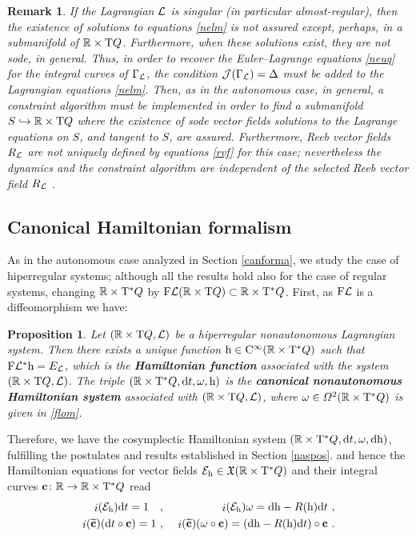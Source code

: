 \documentclass[12pt]{report}
\newtheorem{prop}[teor]{Proposition}
\newtheorem{remark}[teor]{Remark}
\def\bea{\begin{eqnarray}}
\def\eea{\end{eqnarray}}
\def\vf{\mathfrak X}
\def\df{{\mit\Omega}}
\def\Lag{{\cal L}}
\def\d{{\rm d}}
\def\Real{\mathbb{R}}
\def\Tan{{\rm T}}
\def\inn{\mathop{i}\nolimits}
\def\Cinfty{{\rm C}^\infty}
\begin{document}
\begin{remark}{\rm
If the Lagrangian $\Lag$ is singular (in particular almost-regular), 
then the existence of solutions to equations \eqref{nelm}
is not assured except, perhaps, in a
submanifold of $\Real\times\Tan Q$. Furthermore,
when these solutions exist, they are not {\sc sode}, in general.
Thus, in order to recover the Euler--Lagrange equations \eqref{neuq}
for the integral curves of $\Gamma_\Lag$,
the condition ${\cal J}(\Gamma_\Lag)=\Delta$ must be added to the
Lagrangian equations  \eqref{nelm}.
Then, as in the autonomous case, in general,
a constraint algorithm must be implemented in order to find
a submanifold $S\hookrightarrow\Real\times\Tan Q$ where the existence of 
{\sc sode} vector fields solutions to the Lagrange equations on $S$,
and tangent to $S$, are assured.
Furthermore, Reeb vector fields $R_\Lag$ are not uniquely defined by
equations \eqref{rvf} for this case; nevertheless
the dynamics and the constraint algorithm are independent 
of the selected Reeb vector field $R_\Lag$ \cite{CLM-94}. }
\end{remark}


\subsection{Canonical Hamiltonian formalism}


As in the autonomous case analyzed in Section \ref{canforma},
we study the case of hiperregular systems;
although all the results hold also for the case of
regular systems,
changing $\Real\times\Tan^*Q$ by ${\rm F}\Lag (\Real\times\Tan Q)\subset\Real\times\Tan^*Q$.
First, as ${\rm F}\Lag$ is a diffeomorphism we have:

\begin{prop}
Let $(\Real\times\Tan Q,\Lag)$ be a hiperregular nonautonomous Lagrangian system.
Then there exists a unique function ${\rm h}\in\Cinfty (\Real\times\Tan^*Q)$ such that
${\rm F}\Lag^*{\rm h}=E_\Lag$,
which is the \textbf{Hamiltonian function} associated with the system
$(\Real\times\Tan Q,\Lag)$.
The triple $(\Real\times\Tan^*Q,\d t,\omega,{\rm h})$ is the 
\textbf{canonical nonautonomous Hamiltonian system} associated with $(\Real\times\Tan Q,\Lag)$,
where $\omega\in\df^2(\Real\times\Tan^*Q)$
is given in \eqref{flom}.
\end{prop}

Therefore, we have the cosymplectic Hamiltonian system
$(\Real\times\Tan^*Q,\d t,\omega,\d {\rm h})$, fulfilling the postulates and results established in Section \ref{naspos}.
and hence the Hamiltonian equations for vector fields
${\cal E}_{\rm h}\in\vf(\Real\times\Tan^*Q)$ and their
integral curves ${\bf c}\colon\Real\to\Real\times\Tan^*Q$ read
\bea
\inn({\cal E}_{\rm h})\d t=1 \quad&,&\quad 
\inn({\cal E}_{\rm h})\omega = \d{\rm h}- R({\rm h})\d t\ , 
\label{celmh1} \\
\inn(\widetilde{\bf c})(\d t\circ{\bf c})=1 \ & ,& \
\inn(\widetilde{\bf c})(\omega\circ{\bf c}) = (\d{\rm h}- R({\rm h})\d t)\circ{\bf c}\ .
\label{celmh2} 
\eea
\end{document}
